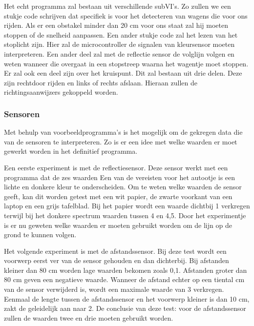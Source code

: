\documentclass[a4paper,twoside,kulak]{kulakreport} %
\begin{document}
Het echt programma zal bestaan uit verschillende subVI's. Zo zullen we een stukje code schrijven dat specifiek is voor het detecteren van wagens die voor ons rijden. Als er een obstakel minder dan 20 cm voor ons staat zal hij moeten stoppen of de snelheid aanpassen. Een ander stukje code zal het lezen van het stoplicht zijn. Hier zal de microcontroller de signalen van kleursensor moeten interpreteren. Een ander deel zal met de reflectie sensor de volglijn volgen en weten wanneer die overgaat in een stopstreep waarna het wagentje moet stoppen.
Er zal ook een deel zijn over het kruispunt. Dit zal bestaan uit drie delen. Deze zijn rechtdoor rijden en links of rechts afslaan. Hieraan zullen de richtingsaanwijzers gekoppeld worden. 

\subsubsection{Sensoren}
Met behulp van voorbeeldprogramma's is het mogelijk om de gekregen data die van de sensoren te interpreteren. Zo is er een idee met welke waarden er moet gewerkt worden in het definitief programma. 

Een eerste experiment is met de reflectiesensor. Deze sensor werkt met een programma dat de zes waarden %
Een van de vereisten voor het autootje is een lichte en donkere kleur te onderscheiden. Om te weten welke waarden de sensor geeft, kan dit worden getest met een wit papier, de zwarte voorkant van een laptop en een grijs tafelblad. Bij het papier wordt een waarde dichtbij 1 verkregen terwijl bij het donkere spectrum waarden tussen 4 en 4,5. %
Door het experimentje is er nu geweten welke waarden er moeten gebruikt worden om de lijn op de grond te kunnen volgen.

Het volgende experiment is met de afstandssensor. Bij deze test wordt een voorwerp eerst ver van de sensor gehouden en dan dichterbij. Bij afstanden kleiner dan 80 cm worden lage waarden bekomen zoals 0,1. Afstanden groter dan 80 cm geven een negatieve waarde. Wanneer de afstand echter op een tiental cm van de sensor verwijderd is, wordt een maximale waarde van 3 verkregen. Eenmaal de lengte tussen de afstandssensor en het voorwerp kleiner is dan 10 cm, zakt de geleidelijk aan naar 2. De conclusie van deze test: voor de afstandssensor zullen de waarden twee en drie moeten gebruikt worden.
\end{document}
